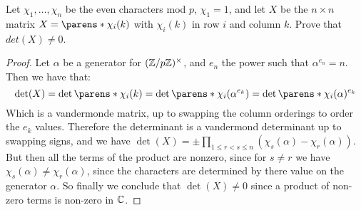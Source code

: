 \documentclass[11pt]{article}
\begin{document}

Let $\chi_1, \dots, \chi_n$ be the even characters mod $p$, $\chi_1 = 1$, and let $X$ be the $n \times n$ matrix $X = \parens*{\chi_i(k)}$ with $\chi_i(k)$ in row $i$ and column $k$.
Prove that $det(X) \ne 0$.

\begin{proof}
  Let $\alpha$ be a generator for $(\mathbb{Z}/p\mathbb{Z})^\times$, and $e_n$ the power such that $\alpha^{e_n} = n$.
  Then we have that:
  \begin{equation*}
    \det(X) = \det \parens*{\chi_i(k)}
    = \det \parens*{\chi_i(\alpha^{e_k})}
    = \det \parens*{\chi_i(\alpha)^{e_k}}
  \end{equation*}
  Which is a vandermonde matrix, up to swapping the column orderings to order the $e_k$ values.
  Therefore the determinant is a vandermond determinant up to swapping signs, and we have $\det(X) = \pm \prod_{1 \le r < s \le n} (\chi_s(\alpha) - \chi_r(\alpha))$.
  But then all the terms of the product are nonzero, since for $s \ne r$ we have $\chi_s(\alpha) \ne \chi_r(\alpha)$, since the characters are determined by there value on the generator $\alpha$.
  So finally we conclude that $\det(X) \ne 0$ since a product of non-zero terms is non-zero in $\mathbb{C}$.
\end{proof}



\end{document}
